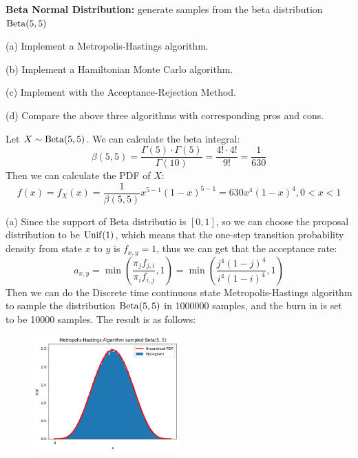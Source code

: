 \begin{homeworkProblem}

\textbf{Beta Normal Distribution:} generate samples from the beta distribution $\operatorname{Beta}(5,5)$

(a) Implement a Metropolis-Hastings algorithm.

(b) Implement a Hamiltonian Monte Carlo algorithm.

(c) Implement with the Acceptance-Rejection Method.

(d) Compare the above three algorithms with corresponding pros and cons.

\solution

Let $X\sim \operatorname{Beta}(5,5)$. We can calculate the beta integral:
$$\beta(5,5)=\dfrac{\Gamma(5)\cdot\Gamma(5)}{\Gamma(10)}=\dfrac{4!\cdot 4!}{9!}=\dfrac{1}{630}$$
Then we can calculate the PDF of $X$:
$$f(x)=f_X(x)=\dfrac{1}{\beta(5,5)}x^{5-1}(1-x)^{5-1}=630x^4(1-x)^4 ,0<x<1$$

(a) Since the support of Beta distributio is $[0,1]$, so we can choose the proposal distribution to be $\operatorname{Unif}(1)$, which means that the one-step transition probability density from state $x$ to $y$ is $f_{x,y}=1$, thus we can get that the acceptance rate:
$$a_{x,y}=\min\left(\dfrac{\pi_jf_{j,i}}{\pi_if_{i,j}},1\right)=\min\left(\dfrac{j^4(1-j)^4}{i^4(1-i)^4},1\right)$$
Then we can do the Discrete time continuous state Metropolis-Hastings algorithm to sample the distribution $\operatorname{Beta}(5,5)$ in 1000000 samples, and the burn in is set to be 10000 samples. The result is as follows:
\begin{figure}[h]
    \centering
    \includegraphics[width=0.5\textwidth]{./figure/p5/MH.png}
\end{figure}


\end{homeworkProblem}
